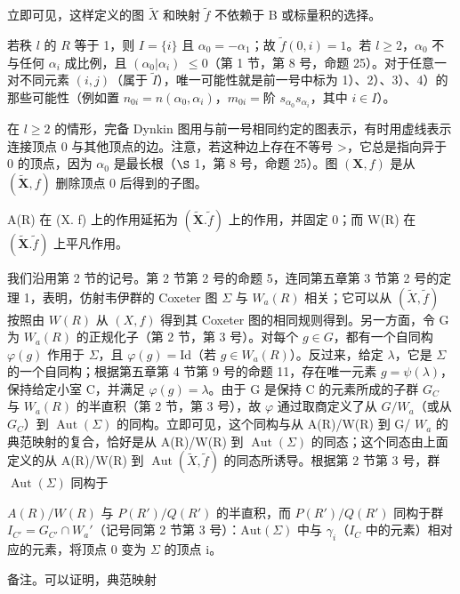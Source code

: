 立即可见，这样定义的图 \(\tilde{X}\) 和映射 \(\tilde{f}\) 不依赖于 B 或标量积的选择。

若秩 \(l\) 的 \(R\) 等于 1，则 \(I = \{i\}\) 且 \(\alpha_0 = -\alpha_1\)；故 \(\tilde{f}(0, i) = 1\)。若 \(l \geqslant 2\)，\(\alpha_0\) 不与任何 \(\alpha_i\) 成比例，且 \((\alpha_0|\alpha_i)\) \(\leqslant 0\)（第 1 节，第 8 号，命题 25）。对于任意一对不同元素 \((i,j)\)（属于 \(\tilde{I}\)），唯一可能性就是前一号中标为 1）、2）、3）、4）的那些可能性（例如置 \(n_{0i} = n(\alpha_0, \alpha_i)\)，\(m_{0i} = \text{阶 } s_{\alpha_0}s_{\alpha_i}\)，其中 \(i \in I\)）。

在 \(l \geqslant 2\) 的情形，完备 Dynkin 图用与前一号相同约定的图表示，有时用虚线表示连接顶点 0 与其他顶点的边。注意，若这种边上存在不等号 \textgreater{}，它总是指向异于 0 的顶点，因为 \(\alpha_{0}\) 是最长根（\(\S\) 1，第 8 号，命题 25）。图 \((\mathbf{X}, f)\) 是从 \((\tilde{\mathbf{X}}, f)\) 删除顶点 0 后得到的子图。

A(R) 在 (X. f) 上的作用延拓为 \((\tilde{\mathbf{X}}.\tilde{f})\) 上的作用，并固定 0；而 W(R) 在 \((\tilde{\mathbf{X}}.\tilde{f})\) 上平凡作用。

我们沿用第 2 节的记号。第 2 节第 2 号的命题 5，连同第五章第 3 节第 2 号的定理 1，表明，仿射韦伊群的 Coxeter 图 \(\Sigma\) 与 \(W_{a}(R)\) 相关；它可以从 \((\tilde{X},\tilde{f})\) 按照由 \(W(R)\) 从 \((X,f)\) 得到其 Coxeter 图的相同规则得到。另一方面，令 G 为 \(W_{a}(R)\) 的正规化子（第 2 节，第 3 号）。对每个 \(g\in G\)，都有一个自同构 \(\varphi(g)\) 作用于 \(\Sigma\)，且 \(\varphi(g)=\mathrm{Id}\)（若 \(g\in W_{a}(R)\)）。反过来，给定 \(\lambda\)，它是 \(\Sigma\) 的一个自同构；根据第五章第 4 节第 9 号的命题 11，存在唯一元素 \(g=\psi(\lambda)\)，保持给定小室 C，并满足 \(\varphi(g)=\lambda\)。由于 G 是保持 C 的元素所成的子群 \(G_{C}\) 与 \(W_{a}(R)\) 的半直积（第 2 节，第 3 号），故 \(\varphi\) 通过取商定义了从 \(G/W_{a}\)（或从 \(G_{C}\)）到 \(\operatorname{Aut}(\Sigma)\) 的同构。立即可见，这个同构与从 A(R)/W(R) 到 G/ \(W_{a}\) 的典范映射的复合，恰好是从 A(R)/W(R) 到 \(\operatorname{Aut}(\Sigma)\) 的同态；这个同态由上面定义的从 A(R)/W(R) 到 \(\operatorname{Aut}(\tilde{X},\tilde{f})\) 的同态所诱导。根据第 2 节第 3 号，群 \(\operatorname{Aut}(\Sigma)\) 同构于

\(A(R)/W(R)\) 与 \(P(R')/Q(R')\) 的半直积，而 \(P(R')/Q(R')\) 同构于群 \(I_{C'} = G_{C'} \cap W_{a}'\)（记号同第 2 节第 3 号）：\(\text{Aut}(\Sigma)\) 中与 \(\gamma_{i}\)（\(I_{C}\) 中的元素）相对应的元素，将顶点 0 变为 \(\Sigma\) 的顶点 i。

备注。可以证明，典范映射

